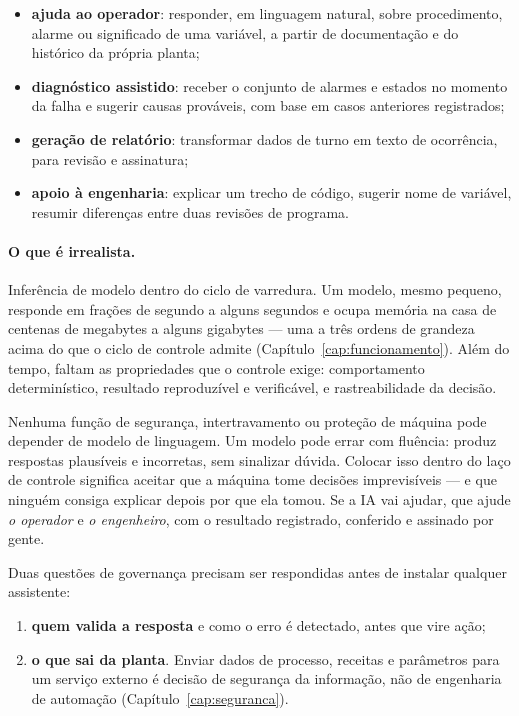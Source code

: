 \begin{itemize}
  \item \textbf{ajuda ao operador}: responder, em linguagem natural, sobre procedimento, alarme ou
        significado de uma variável, a partir de documentação e do histórico da própria planta;
  \item \textbf{diagnóstico assistido}: receber o conjunto de alarmes e estados no momento da falha e
        sugerir causas prováveis, com base em casos anteriores registrados;
  \item \textbf{geração de relatório}: transformar dados de turno em texto de ocorrência, para revisão
        e assinatura;
  \item \textbf{apoio à engenharia}: explicar um trecho de código, sugerir nome de variável, resumir
        diferenças entre duas revisões de programa.
\end{itemize}

\paragraph{O que é irrealista.} Inferência de modelo dentro do ciclo de varredura. Um modelo, mesmo
pequeno, responde em frações de segundo a alguns segundos e ocupa memória na casa de centenas de
megabytes a alguns gigabytes --- uma a três ordens de grandeza acima do que o ciclo de controle
admite (Capítulo~\ref{cap:funcionamento}). Além do tempo, faltam as propriedades que o controle
exige: comportamento determinístico, resultado reproduzível e verificável, e rastreabilidade da
decisão.

\begin{atencao}
Nenhuma função de segurança, intertravamento ou proteção de máquina pode depender de modelo de
linguagem. Um modelo pode errar com fluência: produz respostas plausíveis e incorretas, sem sinalizar
dúvida. Colocar isso dentro do laço de controle significa aceitar que a máquina tome decisões
imprevisíveis --- e que ninguém consiga explicar depois por que ela tomou. Se a IA vai ajudar, que
ajude \emph{o operador} e \emph{o engenheiro}, com o resultado registrado, conferido e assinado por
gente.
\end{atencao}

Duas questões de governança precisam ser respondidas antes de instalar qualquer assistente:

\begin{enumerate}
  \item \textbf{quem valida a resposta} e como o erro é detectado, antes que vire ação;
  \item \textbf{o que sai da planta}. Enviar dados de processo, receitas e parâmetros para um serviço
        externo é decisão de segurança da informação, não de engenharia de automação
        (Capítulo~\ref{cap:seguranca}).
\end{enumerate}

